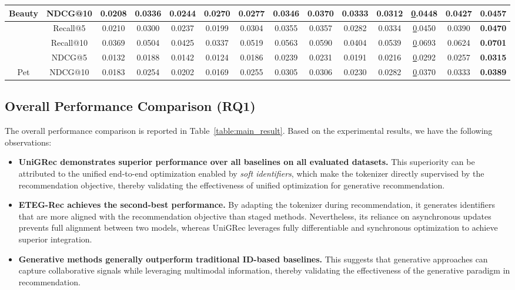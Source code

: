 \begin{table}[t]
{\begin{tabular}{cccccccccccccc}
\multirow{-4}{*}{Beauty}  & NDCG@10                  & 0.0208 & 0.0336  & 0.0244       & 0.0270   & 0.0277 & 0.0346 & 0.0370 & 0.0333 & 0.0312 & {\ul 0.0448} & 0.0427    & {\color[HTML]{000000} \textbf{0.0457}} \\ \hline
                          & Recall@5                 & 0.0210 & 0.0300  & 0.0237       & 0.0199   & 0.0304 & 0.0355 & 0.0357 & 0.0282 & 0.0334 & {\ul 0.0450} & 0.0390    & {\color[HTML]{000000} \textbf{0.0470}} \\
                          & Recall@10                & 0.0369 & 0.0504  & 0.0425       & 0.0337   & 0.0519 & 0.0563 & 0.0590 & 0.0404 & 0.0539 & {\ul 0.0693} & 0.0624    & {\color[HTML]{000000} \textbf{0.0701}} \\
                          & NDCG@5                   & 0.0132 & 0.0188  & 0.0142       & 0.0124   & 0.0186 & 0.0239 & 0.0231 & 0.0191 & 0.0216 & {\ul 0.0292} & 0.0257    & {\color[HTML]{000000} \textbf{0.0315}} \\
\multirow{-4}{*}{Pet}     & NDCG@10                  & 0.0183 & 0.0254  & 0.0202       & 0.0169   & 0.0255 & 0.0305 & 0.0306 & 0.0230 & 0.0282 & {\ul 0.0370} & 0.0333    & {\color[HTML]{000000} \textbf{0.0389}} \\ \hline
\end{tabular}%
}
\end{table}

\subsection{Overall Performance Comparison (RQ1)}
The overall performance comparison is reported in Table~\ref{table:main_result}. Based on the experimental results, we have the following observations:

\begin{itemize}[leftmargin=*]
    \item \textbf{UniGRec demonstrates superior performance over all baselines on all evaluated datasets.} This superiority can be attributed to the unified end-to-end optimization enabled by \textit{soft identifiers}, which make the tokenizer directly supervised by the recommendation objective, thereby validating the effectiveness of unified optimization for generative recommendation.
    \item \textbf{ETEG-Rec achieves the second-best performance.} By adapting the tokenizer during recommendation, it generates identifiers that are more aligned with the recommendation objective than staged methods. Nevertheless, its reliance on asynchronous updates prevents full alignment between two models, whereas UniGRec leverages fully differentiable and synchronous optimization to achieve superior integration.
    \item \textbf{Generative methods generally outperform traditional ID-based baselines.} This suggests that generative approaches can capture collaborative signals while leveraging multimodal information, thereby validating the effectiveness of the generative paradigm in recommendation.
\end{itemize}


